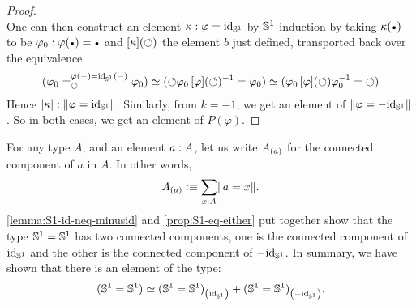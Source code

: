 \documentclass[english,a4paper]{lmcs}
\begin{document}
\begin{proof}
\begin{displaymath}
  \end{displaymath}
  One can then construct an element $\kappa: \varphi = \mathord{\mathrm{id}}_{{\mathbb S^{1}}}$ by
  ${{\mathbb S^{1}}}$-induction by taking $\kappa(\base)$ to be
  $\varphi_0 \from \varphi(\base) = \base$ and $\mathop{\left[{\kappa}\right]}(\mathord{\circlearrowleft})$
  the element $b$ just defined, transported back over the equivalence
  \begin{displaymath}
    (\varphi_0 =^{\varphi(\mathord{{-}}) = \mathord{\mathrm{id}}_{{\mathbb S^{1}}}(\mathord{{-}})}_{\mathord{\circlearrowleft}} \varphi_0) \simeq
    ( \mathord{\circlearrowleft} \varphi_0 \mathop{\left[{\varphi}\right]}(\mathord{\circlearrowleft})^{-1} = \varphi_0)
    \simeq (\varphi_0 \mathop{\left[{\varphi}\right]}(\mathord{\circlearrowleft}) \varphi_0^{-1} = \mathord{\circlearrowleft})
  \end{displaymath}
  Hence $\lvert\kappa\rvert : \lVert\varphi = \mathord{\mathrm{id}}_{{\mathbb S^{1}}}\rVert$.
  Similarly, from $k=-1$, we get an
  element of $\lVert\varphi = -\mathord{\mathrm{id}}_{{\mathbb S^{1}}}\rVert$. So in both cases, we get
  an element of $P(\varphi)$.
\end{proof}

For any type $A$, and an element $a: A$, let us write ${A}_{\left(a\right)}$
for the connected component of $a$ in $A$. In other words,
\begin{displaymath}
  {A}_{\left(a\right)} \vcentcolon\equiv \sum_{x: A}\lVert a=x\rVert.
\end{displaymath}
\cref{lemma:S1-id-neq-minusid} and \cref{prop:S1-eq-either} put
together show that the type ${{\mathbb S^{1}}}={{\mathbb S^{1}}}$ has two connected components,
one is the connected component of $\mathord{\mathrm{id}}_{{\mathbb S^{1}}}$ and the other is the
connected component of $-\mathord{\mathrm{id}}_{{\mathbb S^{1}}}$. In summary, we have shown that
there is an element of the type:
\begin{displaymath}
  ({{\mathbb S^{1}}}={{\mathbb S^{1}}}) \simeq {({{\mathbb S^{1}}}={{\mathbb S^{1}}})}_{\left(\mathord{\mathrm{id}}_{{\mathbb S^{1}}}\right)} + {({{\mathbb S^{1}}}={{\mathbb S^{1}}})}_{\left(-\mathord{\mathrm{id}}_{{\mathbb S^{1}}}\right)}.
\end{displaymath}
\end{document}
